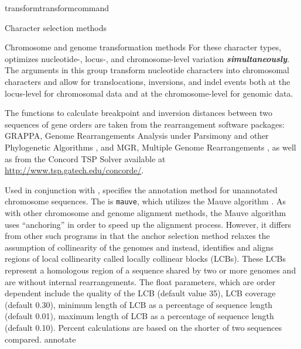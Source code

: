\begin{command}{transform}{transformcommand}
\begin{arguments}
\begin{argumentgroup}{Character selection methods}
             \end{argumentgroup}
         

        \begin{argumentgroup}{Chromosome and genome transformation methods}
            For these character types, \poy optimizes nucleotide-, 
            locus-, and chromosome-level variation {\bf \emph{simultaneously}}. The arguments in this group
            transform nucleotide characters into chromosomal characters and allow for 
            translocations, inversions, and indel events both at the locus-level for chromosomal data 
            and at the chromosome-level for genomic data.
           
           \indent The functions to calculate breakpoint and inversion distances between
            two sequences of gene orders are taken from the rearrangement software
            packages: GRAPPA, Genome Rearrangements Analysis under Parsimony and
            other Phylogenetic Algorithms \cite{baderetal2002}, and MGR, Multiple
            Genome Rearrangements \cite{bourqueandpevzner2002}, as well as from
            the Concord TSP Solver available at \url{http://www.tsp.gatech.edu/concorde/}.

                {Used in conjunction with , specifies the annotation 
                method for unannotated chromosome 
                sequences. The \poylident is \texttt{mauve}, which utilizes the 
                Mauve algorithm \cite{darlingetal2004}. As with other chromosome 
                and genome alignment methods, the Mauve algorithm uses ``anchoring'' 
                in order to speed up the alignment process. However, it differs from 
                other such programs in that the anchor selection method relaxes 
                the assumption of collinearity of the genomes and instead, identifies 
                and aligns regions of local collinearity called locally collinear 
                blocks (LCBs). These LCBs represent a homologous region 
                of a sequence shared by two or more genomes and are without internal
                rearrangements.  The float parameters, which are order dependent 
                 include the quality of the LCB (default value 35), LCB coverage (default 0.30), 
                minimum length of LCB as a percentage of sequence length (default 0.01), 
                maximum length of LCB as a percentage of sequence length (default 0.10).  
                Percent calculations are based on the shorter of two sequences compared.}
                {annotate}
             

\end{argumentgroup}
\end{arguments}
\end{command}
